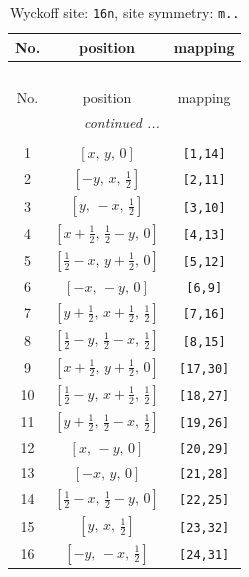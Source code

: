 \documentclass[fleqn,8pt]{jsarticle}
\begin{document}
\renewcommand{\arraystretch}{1.2}
\begin{longtable}{ccc}
\caption{Wyckoff site: {\tt 16n}, site symmetry: {\tt m..}}
 \\
 \hline \hline
No. & position & mapping \\ \hline \endfirsthead

\multicolumn{2}{l}{\tablename\ \thetable{}} \\
 \hline \hline
No. & position & mapping \\ \hline \endhead

 \hline \hline
\multicolumn{2}{r}{\footnotesize\it continued ...} \\ \endfoot

 \hline \hline
\multicolumn{2}{r}{} \\ \endlastfoot

1 & $\left[ x,\, y,\, 0 \right]$ & {\tt [1,14]} \\ \hline
2 & $\left[ - y,\, x,\, \frac{1}{2} \right]$ & {\tt [2,11]} \\ \hline
3 & $\left[ y,\, - x,\, \frac{1}{2} \right]$ & {\tt [3,10]} \\ \hline
4 & $\left[ x + \frac{1}{2},\, \frac{1}{2} - y,\, 0 \right]$ & {\tt [4,13]} \\ \hline
5 & $\left[ \frac{1}{2} - x,\, y + \frac{1}{2},\, 0 \right]$ & {\tt [5,12]} \\ \hline
6 & $\left[ - x,\, - y,\, 0 \right]$ & {\tt [6,9]} \\ \hline
7 & $\left[ y + \frac{1}{2},\, x + \frac{1}{2},\, \frac{1}{2} \right]$ & {\tt [7,16]} \\ \hline
8 & $\left[ \frac{1}{2} - y,\, \frac{1}{2} - x,\, \frac{1}{2} \right]$ & {\tt [8,15]} \\ \hline
9 & $\left[ x + \frac{1}{2},\, y + \frac{1}{2},\, 0 \right]$ & {\tt [17,30]} \\ \hline
10 & $\left[ \frac{1}{2} - y,\, x + \frac{1}{2},\, \frac{1}{2} \right]$ & {\tt [18,27]} \\ \hline
11 & $\left[ y + \frac{1}{2},\, \frac{1}{2} - x,\, \frac{1}{2} \right]$ & {\tt [19,26]} \\ \hline
12 & $\left[ x,\, - y,\, 0 \right]$ & {\tt [20,29]} \\ \hline
13 & $\left[ - x,\, y,\, 0 \right]$ & {\tt [21,28]} \\ \hline
14 & $\left[ \frac{1}{2} - x,\, \frac{1}{2} - y,\, 0 \right]$ & {\tt [22,25]} \\ \hline
15 & $\left[ y,\, x,\, \frac{1}{2} \right]$ & {\tt [23,32]} \\ \hline
16 & $\left[ - y,\, - x,\, \frac{1}{2} \right]$ & {\tt [24,31]} \\
\end{longtable}
\end{document}

